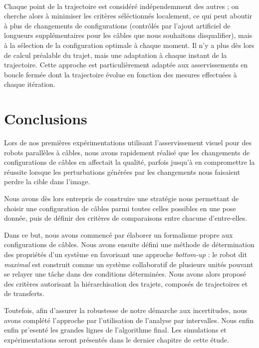 \\

Chaque point de la trajectoire est consid\'er\'e ind\'ependemment des autres ; 
on cherche alors \`a minimiser les crit\`eres s\'el\'ectionn\'es localement, ce 
qui peut aboutir \`a plus de changements de configurations (contr\^ol\'es par 
l'ajout artificiel de longueurs suppl\'ementaires pour les c\^ables que nous 
souhaitons disqualifier), mais \`a la s\'election de la configuration optimale 
\`a chaque moment. Il n'y a plus d\`es lors de calcul pr\'ealable du trajet, 
mais une adaptation \`a chaque instant de la trajectoire. Cette approche est 
particuli\`erement adapt\'ee aux asservissements en boucle ferm\'ee dont la 
trajectoire \'evolue en fonction des mesures effectu\'ees \`a chaque 
it\'eration. 

\section{Conclusions}

Lors de nos premi\`eres exp\'erimentations utilisant l'asservissement visuel 
pour des robots parall\`eles \`a c\^ables, nous avons rapidement r\'ealis\'e 
que les changements de configurations de c\^ables en affectait la qualit\'e, 
parfois jusqu'\`a en compromettre la r\'eussite lorsque les perturbations 
g\'en\'er\'ees par les changements nous faisaient perdre la cible dans l'image.

Nous avons d\`es lors entrepris de construire une strat\'egie nous permettant 
de choisir une configuration de c\^ables parmi toutes celles possibles en une 
pose donn\'ee, puis de d\'efinir des crit\`eres de comparaisons entre chacune 
d'entre-elles.

Dans ce but, nous avons commenc\'e par \'elaborer un formalisme propre aux 
configurations de c\^ables. Nous avons ensuite d\'efini une m\'ethode de 
d\'etermination des propri\'et\'es d'un syst\`eme en favorisant une approche 
{\it bottom-up} : le robot dit {\it maximal} est construit comme un syst\`eme 
collaboratif de plusieurs unit\'es pouvant se relayer une t\^ache dans des
conditions d\'etermin\'ees. Nous avons alors propos\'e des crit\`eres 
autorisant la hi\'erarchisation des trajets, compos\'es de trajectoires et de 
transferts.

Toutefois, afin d'assurer la robustesse de notre d\'emarche aux incertitudes, 
nous avons compl\'et\'e l'approche par l'utilisation de l'analyse par 
intervalles. Nous enfin enfin pr'esent\'e les grandes lignes de l'algorithme 
final. Les simulations et exp\'erimentations seront pr\'esent\'es dans le 
dernier chapitre de cette \'etude.